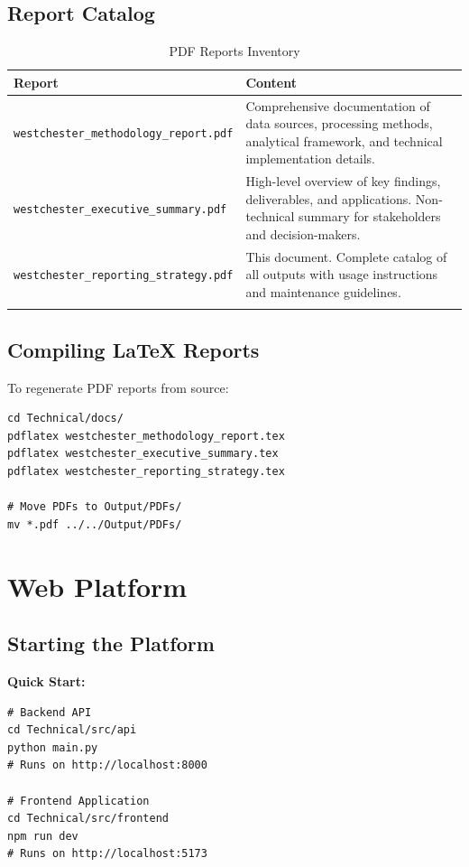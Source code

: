 \documentclass[11pt,letterpaper]{article}
\begin{document}
\subsection{Report Catalog}

\begin{longtable}{p{6cm}p{9cm}}
\toprule
\textbf{Report} & \textbf{Content} \\
\midrule
\endhead

\texttt{westchester\_methodology\_report.pdf} & 
Comprehensive documentation of data sources, processing methods, analytical framework, and technical implementation details. \\

\texttt{westchester\_executive\_summary.pdf} & 
High-level overview of key findings, deliverables, and applications. Non-technical summary for stakeholders and decision-makers. \\

\texttt{westchester\_reporting\_strategy.pdf} & 
This document. Complete catalog of all outputs with usage instructions and maintenance guidelines. \\

\bottomrule
\caption{PDF Reports Inventory}
\end{longtable}

\subsection{Compiling LaTeX Reports}
To regenerate PDF reports from source:
\begin{verbatim}
cd Technical/docs/
pdflatex westchester_methodology_report.tex
pdflatex westchester_executive_summary.tex
pdflatex westchester_reporting_strategy.tex

# Move PDFs to Output/PDFs/
mv *.pdf ../../Output/PDFs/
\end{verbatim}

\section{Web Platform}

\subsection{Starting the Platform}

\textbf{Quick Start:}
\begin{verbatim}
# Backend API
cd Technical/src/api
python main.py
# Runs on http://localhost:8000

# Frontend Application
cd Technical/src/frontend
npm run dev
# Runs on http://localhost:5173
\end{verbatim}
\end{document}

